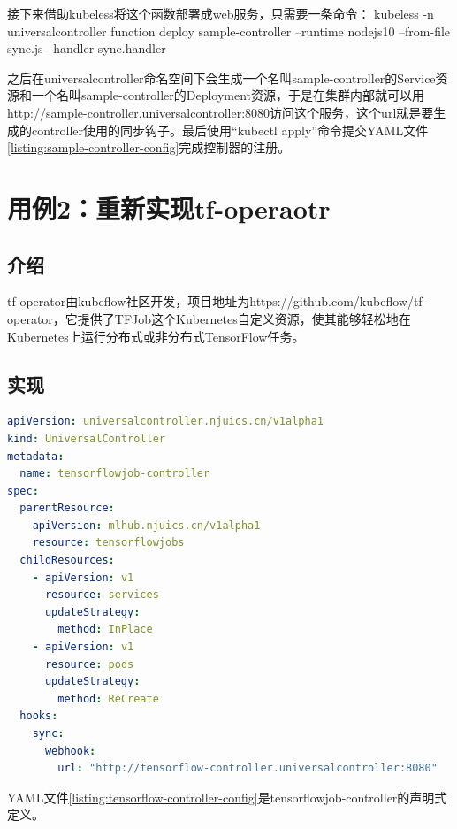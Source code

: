 \documentclass[macfonts,master]{njuthesis}
\begin{document}
接下来借助kubeless将这个函数部署成web服务，只需要一条命令：
kubeless -n universalcontroller function deploy sample-controller --runtime nodejs10 --from-file sync.js --handler sync.handler

之后在universalcontroller命名空间下会生成一个名叫sample-controller的Service资源和一个名叫sample-controller的Deployment资源，于是在集群内部就可以用http://sample-controller.universalcontroller:8080访问这个服务，这个url就是要生成的controller使用的同步钩子。最后使用``kubectl apply''命令提交YAML文件\ref{listing:sample-controller-config}完成控制器的注册。
\section{用例2：重新实现tf-operaotr}
\subsection{介绍}
tf-operator由kubeflow社区开发，项目地址为https://github.com/kubeflow/tf-operator，它提供了TFJob这个Kubernetes自定义资源，使其能够轻松地在Kubernetes上运行分布式或非分布式TensorFlow任务。
\subsection{实现}

\begin{lstlisting}[language=yaml,caption=tensorflowjob-controller的配置文件,label=listing:tensorflow-controller-config]
apiVersion: universalcontroller.njuics.cn/v1alpha1
kind: UniversalController
metadata:
  name: tensorflowjob-controller
spec:
  parentResource:
    apiVersion: mlhub.njuics.cn/v1alpha1
    resource: tensorflowjobs
  childResources:
    - apiVersion: v1
      resource: services
      updateStrategy:
        method: InPlace
    - apiVersion: v1
      resource: pods
      updateStrategy:
        method: ReCreate
  hooks:
    sync:
      webhook:
        url: "http://tensorflow-controller.universalcontroller:8080"
\end{lstlisting}

YAML文件\ref{listing:tensorflow-controller-config}是tensorflowjob-controller的声明式定义。
\end{document}
